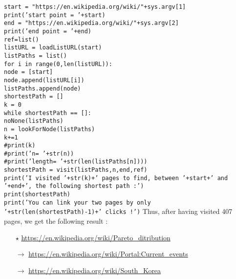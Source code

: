 \documentclass[a4paper]{report}
\begin{document}
\noindent \texttt{start = "https://en.wikipedia.org/wiki/"+sys.argv[1]}\\
\texttt{print('start point = '+start)}\\
\texttt{end = "https://en.wikipedia.org/wiki/"+sys.argv[2]}\\
\texttt{print('end point = '+end)}\\
\texttt{ref=list()}\\
\texttt{listURL = loadListURL(start)}\\
\texttt{listPaths = list()}\\
\texttt{for i in range(0,len(listURL)):}\\
\hspace*{1cm}	\texttt{node = [start]}\\
\hspace*{1cm}	\texttt{node.append(listURL[i])}\\
\hspace*{1cm}	\texttt{listPaths.append(node)}\\

\noindent \texttt{shortestPath = []}\\
\texttt{k = 0}\\
\texttt{while shortestPath == []:}\\
\hspace*{1cm}	\texttt{noNone(listPaths)}\\
\hspace*{1cm}	\texttt{n = lookForNode(listPaths)}\\
\hspace*{1cm}	\texttt{k+=1}\\
\hspace*{1cm}	\texttt{\#print(k)}\\
\hspace*{1cm}	\texttt{\#print('n= '+str(n))}\\
\hspace*{1cm}	\texttt{\#print('length= '+str(len(listPaths[n])))}\\
\hspace*{1cm}	\texttt{shortestPath = visit(listPaths,n,end,ref)}\\

\noindent \texttt{print('I visited '+str(k)+' pages to find, between '+start+' and '+end+', the following shortest path :')}\\
\texttt{print(shortestPath)}\\
\texttt{print('You can link your two pages by only '+str(len(shortestPath)-1)+' clicks !')}
\medbreak
Thus, after having visited 407 pages, we get the following result :
\medbreak
\begin{itemize}
\item[$\star$] \url{https://en.wikipedia.org/wiki/Pareto_ditribution}
\item[$\rightarrow$] \url{https://en.wikipedia.org/wiki/Portal:Current_events}
\item[$\rightarrow$] \url{https://en.wikipedia.org/wiki/South_Korea}
\end{itemize}
\pagebreak
\end{document}
